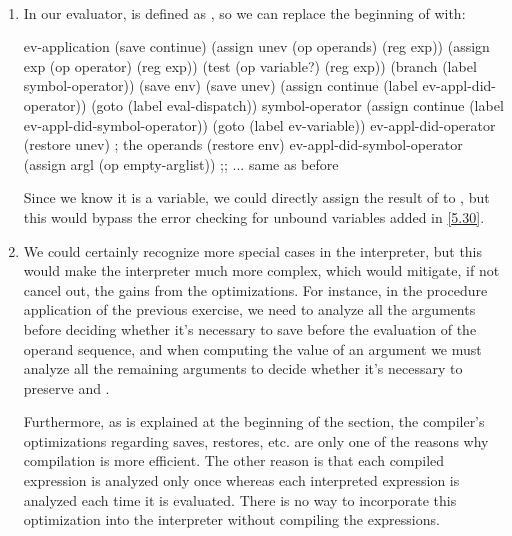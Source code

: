 \begin{exe}[5.32]
    \ \vspace{-20pt}
    \begin{enumerate}
	\item In our evaluator,  is defined as , 
	    so we can replace the beginning of  with:
            \begin{cscm}
                ev-application
                    (save continue)
                    (assign unev (op operands) (reg exp))
                    (assign exp (op operator) (reg exp))
                    (test (op variable?) (reg exp))
                    (branch (label symbol-operator))
                    (save env)
                    (save unev)
                    (assign continue (label ev-appl-did-operator))
                    (goto (label eval-dispatch))
                symbol-operator
                    (assign continue (label ev-appl-did-symbol-operator))
                    (goto (label ev-variable))
                ev-appl-did-operator
                    (restore unev)          ; the operands
                    (restore env)
                ev-appl-did-symbol-operator
                    (assign argl (op empty-arglist))
                ;; ... same as before
            \end{cscm}
            Since we know it is a variable, we could directly assign the result 
            of  to , but this would bypass 
            the error checking for unbound variables added in \autoref{5.30}.
        \item We could certainly recognize more special cases in the 
            interpreter, but this would make the interpreter much more complex, 
            which would mitigate, if not cancel out, the gains from the 
            optimizations. For instance, in the procedure application of the 
            previous exercise, we need to analyze all the arguments before 
            deciding whether it’s necessary to save  before the 
            evaluation of the operand sequence, and when computing the value of 
            an argument we must analyze all the remaining arguments to decide 
            whether it’s necessary to preserve  and .

            Furthermore, as is explained at the beginning of the section, the 
            compiler’s optimizations regarding saves, restores, etc. are only 
            one of the reasons why compilation is more efficient. The other 
            reason is that each compiled expression is analyzed only once 
            whereas each interpreted expression is analyzed each time it is 
            evaluated. There is no way to incorporate this optimization into the 
            interpreter without compiling the expressions.
    \end{enumerate}
\end{exe}

